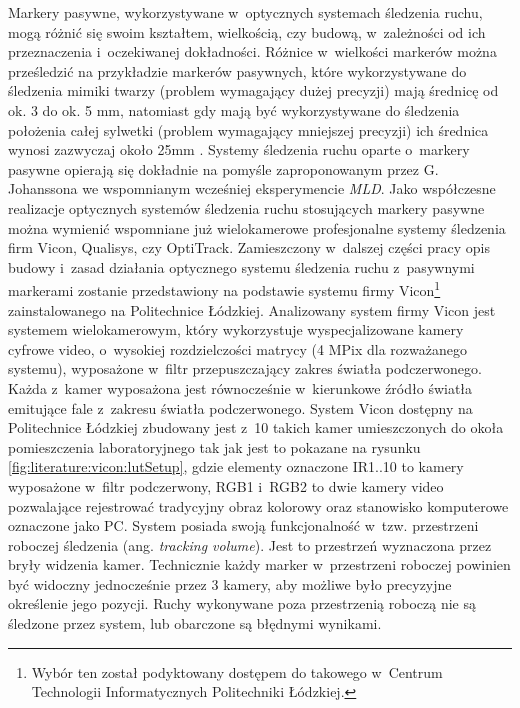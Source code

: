 Markery pasywne, wykorzystywane w~optycznych systemach śledzenia ruchu, mogą różnić się swoim kształtem, wielkością, czy budową, w~zależności od ich przeznaczenia i~oczekiwanej dokładności. Różnice w~wielkości markerów można prześledzić na przykładzie markerów pasywnych, które wykorzystywane do śledzenia mimiki twarzy (problem wymagający dużej precyzji) mają średnicę od ok. 3 do ok. 5 mm, natomiast gdy mają być wykorzystywane do śledzenia położenia całej sylwetki (problem wymagający mniejszej precyzji) ich średnica wynosi zazwyczaj około 25mm \cite{ViconMarkersSet}. Systemy śledzenia ruchu oparte o~markery pasywne opierają się dokładnie na pomyśle zaproponowanym przez G. Johanssona we wspomnianym wcześniej eksperymencie \textsl{MLD}. Jako współczesne realizacje optycznych systemów śledzenia ruchu stosujących markery pasywne można wymienić wspomniane już wielokamerowe profesjonalne systemy śledzenia firm Vicon, Qualisys, czy OptiTrack. 
Zamieszczony w~dalszej części pracy opis budowy i~zasad działania optycznego systemu śledzenia ruchu z~pasywnymi markerami zostanie przedstawiony na podstawie systemu firmy Vicon\footnote{Wybór ten został podyktowany dostępem do takowego w~Centrum Technologii Informatycznych Politechniki Łódzkiej.} zainstalowanego na Politechnice Łódzkiej. 
Analizowany system firmy Vicon jest systemem wielokamerowym, który wykorzystuje wyspecjalizowane kamery cyfrowe video, o~wysokiej rozdzielczości matrycy (4 MPix dla rozważanego systemu), wyposażone w~filtr przepuszczający zakres światła podczerwonego. Każda z~kamer wyposażona jest równocześnie w~kierunkowe źródło światła emitujące fale z~zakresu światła podczerwonego. System Vicon dostępny na Politechnice Łódzkiej zbudowany jest z~10 takich kamer umieszczonych do okoła pomieszczenia laboratoryjnego tak jak jest to pokazane na rysunku \ref{fig:literature:vicon:lutSetup}, gdzie elementy oznaczone IR1..10 to kamery wyposażone w~filtr podczerwony, RGB1 i~RGB2 to dwie kamery video pozwalające rejestrować tradycyjny obraz kolorowy oraz stanowisko komputerowe oznaczone jako PC. System posiada swoją funkcjonalność w~tzw. przestrzeni roboczej śledzenia (ang. \textsl{tracking volume}). Jest to przestrzeń wyznaczona przez bryły widzenia kamer. Technicznie każdy marker w~przestrzeni roboczej powinien być widoczny jednocześnie przez 3 kamery, aby możliwe było precyzyjne określenie jego pozycji. Ruchy wykonywane poza przestrzenią roboczą nie są śledzone przez system, lub obarczone są błędnymi wynikami.

